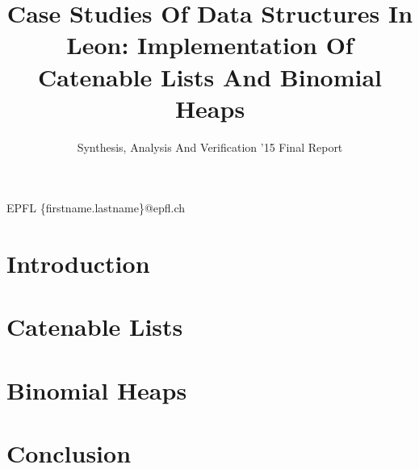 \documentclass[nocopyrightspace,11pt,authoryear,preprint]{sigplanconf}
\begin{document}


\title{Case Studies Of Data Structures In Leon: Implementation Of Catenable Lists And Binomial Heaps}
\subtitle{Synthesis, Analysis And Verification '15 Final Report}

           {EPFL}
           {\{firstname.lastname\}@epfl.ch}

\maketitle

\section{Introduction}


\section{Catenable Lists}


\section{Binomial Heaps}


\section{Conclusion}




\end{document}

